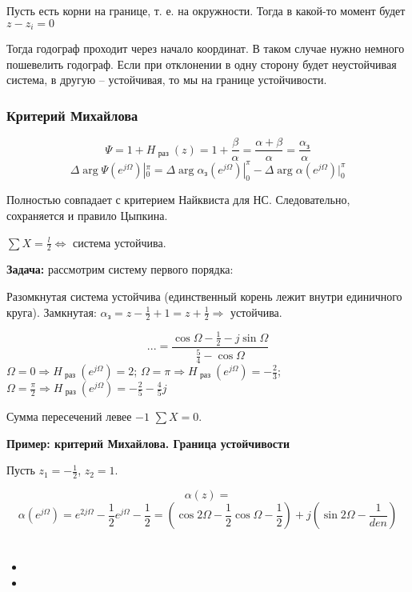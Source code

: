 \documentclass[main.tex]{subfiles}
\begin{document}
Пусть есть корни на границе, т. е. на окружности.
Тогда в какой-то момент будет $ z - z_i = 0 $


Тогда годограф проходит через начало координат.
В таком случае нужно немного пошевелить годограф.
Если при отклонении в одну сторону будет неустойчивая система, в другую -- устойчивая, то мы на границе устойчивости.


\subsubsection{ Критерий Михайлова }

\[\Psi = 1 + H_{\text{ раз }}(z) = 1 + \frac{\beta}{\alpha} = \frac{\alpha + \beta}{\alpha} = \frac{\alpha_{\text{з}}}{\alpha} \]
\[ \Delta \arg \Psi(e^{j \Omega})|_0^\pi = \Delta \arg \alpha_{\text{з}}(e^{j \Omega})|_0^\pi - \Delta \arg \alpha(e^{j \Omega})|_0^\pi \]

Полностью совпадает с критерием Найквиста для НС.
Следовательно, сохраняется и правило Цыпкина.


$ \sum X = \frac{l}{2} \Leftrightarrow $ система устойчива.

\textbf{ Задача: }
рассмотрим систему первого порядка:


Разомкнутая система устойчива (единственный корень лежит внутри единичного круга).
Замкнутая: $ \alpha_{\text{з}} = z - \frac{1}{2} + 1 = z + \frac{1}{2} \Rightarrow $ устойчива.


\[ ... = \frac{\cos \Omega - \frac{1}{2} - j \sin \Omega}{\frac{5}{4} - \cos \Omega } \]
$ \Omega = 0 \Rightarrow H_{\text{ раз }}(e^{j \Omega}) = 2 $; $ \Omega = \pi \Rightarrow H_{\text{ раз }}(e^{j \Omega}) = - \frac{2}{3} $; $ \Omega = \frac{\pi}{2} \Rightarrow H_{\text{ раз }}(e^{j \Omega}) = - \frac{2}{5} - \frac{4}{5} j $


Сумма пересечений левее $ -1 $ $ \sum X = 0 $.

\textbf{ Пример: критерий Михайлова. Граница устойчивости }

Пусть $ z_1 = - \frac{1}{2} $, $ z_2 = 1 $.


\[ \alpha(z) =  \]
\[ \alpha(e^{j \Omega}) = e^{2j \Omega} - \frac{1}{2} e^{j \Omega} - \frac{1}{2} = (\cos 2 \Omega - \frac{1}{2} \cos \Omega - \frac{1}{2}) + j (\sin 2 \Omega - \frac{1}{den}) \] %

\[  \]
\subsubsection{  }

\begin{itemize}[noitemsep]
	\item 
	\item 
\end{itemize}
\end{document}
